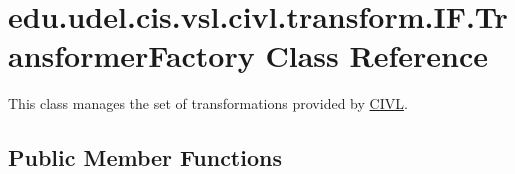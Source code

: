 \hypertarget{classedu_1_1udel_1_1cis_1_1vsl_1_1civl_1_1transform_1_1IF_1_1TransformerFactory}{}\section{edu.\+udel.\+cis.\+vsl.\+civl.\+transform.\+I\+F.\+Transformer\+Factory Class Reference}
\label{classedu_1_1udel_1_1cis_1_1vsl_1_1civl_1_1transform_1_1IF_1_1TransformerFactory}


This class manages the set of transformations provided by \hyperlink{classedu_1_1udel_1_1cis_1_1vsl_1_1civl_1_1CIVL}{C\+I\+V\+L}.  


\subsection*{Public Member Functions}
